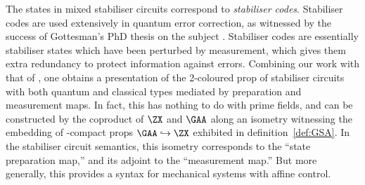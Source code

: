 The states in mixed stabiliser circuits correspond to {\em stabiliser codes}.  Stabiliser codes are used extensively in quantum error correction, as witnessed by the success of Gottesman's PhD thesis on the subject \cite{gottesman}.  Stabiliser codes are essentially stabiliser states which have been perturbed by measurement, which gives them extra redundancy to protect information against errors.
Combining our work with that of \textcite{comfort_algebra_2023},  one obtains a presentation of the 2-coloured prop of stabiliser circuits with both quantum and classical types mediated by preparation and measurement maps. In fact, this has nothing to do with prime fields, and can be constructed by the coproduct of \(\ZX\) and \(\GAA\) along an isometry witnessing the embedding of \dag-compact props \(\GAA\hookrightarrow\ZX\) exhibited in definition~\ref{def:GSA}.  In the stabiliser circuit semantics, this isometry corresponds to the ``state preparation map,'' and its adjoint to the ``measurement map.'' But more generally, this provides a syntax for mechanical systems with affine control.
